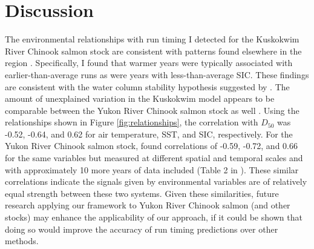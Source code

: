 \documentclass[12pt,]{book}
\theoremstyle{definition}
\theoremstyle{definition}
\theoremstyle{definition}
\theoremstyle{remark}
\begin{document}
\section{Discussion}\label{discussion}

The environmental relationships with run timing I detected for the
Kuskokwim River Chinook salmon stock are consistent with patterns found
elsewhere in the region
\citep[e.g.,][]{mundy-evenson-2011, hodgson-etal-2006}. Specifically, I
found that warmer years were typically associated with
earlier-than-average runs as were years with less-than-average SIC.
These findings are consistent with the water column stability hypothesis
suggested by \citet{mundy-evenson-2011}. The amount of unexplained
variation in the Kuskokwim model appears to be comparable between the
Yukon River Chinook salmon stock as well \citep{mundy-evenson-2011}.
Using the relationships shown in Figure \ref{fig:relationships}, the
correlation with \(D_{50}\) was -0.52, -0.64, and 0.62 for air
temperature, SST, and SIC, respectively. For the Yukon River Chinook
salmon stock, \citet{mundy-evenson-2011} found correlations of -0.59,
-0.72, and 0.66 for the same variables but measured at different spatial
and temporal scales and with approximately 10 more years of data
included (Table 2 in \citet{mundy-evenson-2011}). These similar
correlations indicate the signals given by environmental variables are
of relatively equal strength between these two systems. Given these
similarities, future research applying our framework to Yukon River
Chinook salmon (and other stocks) may enhance the applicability of our
approach, if it could be shown that doing so would improve the accuracy
of run timing predictions over other methods.
\end{document}
